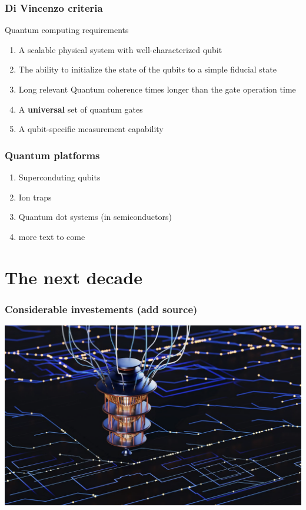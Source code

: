 \documentclass{beamer}
\begin{document}
\begin{frame}
\frametitle{Di Vincenzo criteria}

\begin{alertblock}{Quantum computing requirements }
\begin{enumerate}
\item A scalable physical system with well-characterized qubit

\item The ability to initialize the state of the qubits to a simple fiducial state

\item Long relevant Quantum coherence times longer than the gate operation time

\item A \textbf{universal} set of quantum gates

\item A qubit-specific measurement capability
\end{enumerate}

\noindent
\end{alertblock}
\end{frame}

\begin{frame}
\frametitle{Quantum platforms}

\begin{enumerate}
\item Superconduting qubits
\item Ion traps
\item Quantum dot systems (in semiconductors)
\item more text to come

\end{enumerate}


\end{frame}



\section{The next decade}

\begin{frame}
\frametitle{Considerable investements (add source)}


\centerline{\includegraphics[width=0.9\linewidth]{qcfigures/image1.png}}

\end{frame}
\end{document}
